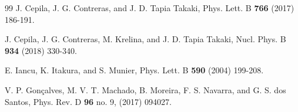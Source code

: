 \documentclass[12pt]{article}
\begin{document}
\begin{thebibliography}{99}
J. Cepila, J. G. Contreras, and J. D. Tapia Takaki, Phys. Lett. B {\bf 766} (2017) 186-191.

J. Cepila, J. G. Contreras, M. Krelina, and J. D. Tapia Takaki, Nucl. Phys. B {\bf 934} (2018) 330-340.

E. Iancu, K. Itakura, and S. Munier, Phys. Lett. B {\bf 590} (2004) 199-208.

V. P. Gonçalves, M. V. T. Machado, B. Moreira, F. S. Navarra, and G. S. dos Santos, Phys. Rev. D {\bf 96} no. 9, (2017) 094027.

\end{thebibliography}

 
\end{document}

